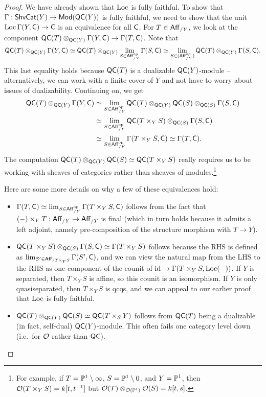 \documentclass{article}
\begin{document}
\begin{proof}
	We have already shown that $\operatorname{Loc}$ is fully faithful.
	To show that $\Gamma: \mathsf{ShvCat}(Y) \to \mathsf{Mod}(\mathsf{QC}(Y))$ is fully faithful, we need to show that the unit $\operatorname{Loc} \Gamma(Y, \mathsf{C}) \to \mathsf{C}$ is an equivalence for all $\mathsf{C}$.
	For $T \in \mathsf{Aff}_{/Y}$, we look at the component $\mathsf{QC}(T) \otimes_{\mathsf{QC}(Y)} \Gamma(Y, \mathsf{C}) \to \Gamma(T, \mathsf{C})$.
	Note that
	\[
		\mathsf{QC}(T) \otimes_{\mathsf{QC}(Y)} \Gamma(Y, \mathsf{C}) \simeq \mathsf{QC}(T) \otimes_{\mathsf{QC}(Y)} \lim_{S \in \mathsf{Aff}_{/Y}^{\mathrm{op}}} \Gamma(S, \mathsf{C}) \simeq \lim_{S \in (\mathsf{Aff}_{/Y}^{\mathrm{op}})} \mathsf{QC}(T) \otimes_{\mathsf{QC}(Y)} \Gamma(S, \mathsf{C}).
	\]
	This last equality holds because $\mathsf{QC}(T)$ is a dualizable $\mathsf{QC}(Y)$-module -- alternatively, we can work with a finite cover of $Y$ and not have to worry about issues of dualizability.
	Continuing on, we get
	\begin{align*}
		\mathsf{QC}(T) \otimes_{\mathsf{QC}(Y)} \Gamma(Y, \mathsf{C}) &\simeq \lim_{S \in \mathsf{Aff}_{/Y}^{\mathrm{op}}} \mathsf{QC}(T) \otimes_{\mathsf{QC}(Y)} \mathsf{QC}(S) \otimes_{\mathsf{QC}(S)} \Gamma(S, \mathsf{C}) \\
		&\simeq \lim_{S \in \mathsf{Aff}_{/Y}^{\mathrm{op}}} \mathsf{QC}(T \times_Y S) \otimes_{\mathsf{QC}(S)} \Gamma(S, \mathsf{C}) \\
		&\simeq \lim_{S \in \mathsf{Aff}_{/Y}^{\mathrm{op}}} \Gamma(T \times_Y S, \mathsf{C}) \simeq \Gamma(T, \mathsf{C}).
	\end{align*}
	The computation $\mathsf{QC}(T) \otimes_{\mathsf{QC}(Y)} \mathsf{QC}(S) \simeq \mathsf{QC}(T \times_Y S)$ really requires us to be working with sheaves of categories rather than sheaves of modules.\footnote{For example, if $T = \mathbb{P}^1 \setminus \infty$, $S = \mathbb{P}^1 \setminus 0$, and $Y = \mathbb{P}^1$, then $\mathcal{O}(T \times_Y S) = k[t, t^{-1}]$ but $\mathcal{O}(T) \otimes_{\mathcal{O}(\mathbb{P}^1)} \mathcal{O}(S) = k[t, s]$.}

	Here are some more details on why a few of these equivalences hold:
	\begin{itemize}
		\item $\Gamma(T, \mathsf{C}) \simeq \lim_{S \in \mathsf{Aff}_{/Y}^{\mathrm{op}}} \Gamma(T \times_Y S, \mathsf{C})$ follows from the fact that $(-) \times_Y T : \mathsf{Aff}_{/Y} \to \mathsf{Aff}_{/T}$ is final (which in turn holds because it admits a left adjoint, namely pre-composition of the structure morphism with $T \to Y$).
		\item $\mathsf{QC}(T \times_Y S) \otimes_{\mathsf{QC}(S)} \Gamma(S, \mathsf{C}) \simeq \Gamma(T \times_Y S)$ follows because the RHS is defined as $\lim_{S' \in \mathsf{Aff}_{/T \times_Y S}} \Gamma(S', \mathsf{C})$, and we can view the natural map from the LHS to the RHS as one component of the counit of $\operatorname{id} \to \Gamma(T \times_Y S, \operatorname{Loc}(-))$.
			If $Y$ is separated, then $T \times_Y S$ is affine, so this counit is an isomorphism.
			If $Y$ is only quasiseparated, then $T \times_Y S$ is qcqs, and we can appeal to our earlier proof that $\operatorname{Loc}$ is fully faithful.
		\item $\mathsf{QC}(T) \otimes_{\mathsf{QC}(Y)} \mathsf{QC}(S) \simeq \mathsf{QC}(T \times_S Y)$ follows from $\mathsf{QC}(T)$ being a dualizable (in fact, self-dual) $\mathsf{QC}(Y)$-module.
			This often fails one category level down (i.e.\ for $\mathcal{O}$ rather than $\mathsf{QC}$).
	\end{itemize}
\end{proof}
\end{document}
